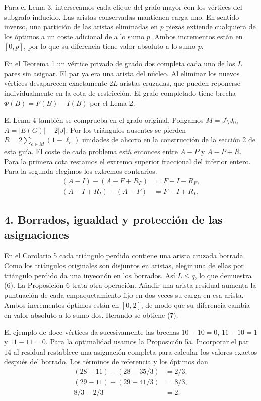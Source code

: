 \documentclass[spanish,11pt,a4paper]{article}
\begin{document}
Para el Lema 3, intersecamos cada clique del grafo mayor con los vértices del subgrafo inducido. Las aristas conservadas mantienen carga uno. En sentido inverso, una partición de las aristas eliminadas en \(p\) piezas extiende cualquiera de los óptimos a un coste adicional de a lo sumo \(p\). Ambos incrementos están en \([0,p]\), por lo que su diferencia tiene valor absoluto a lo sumo \(p\).

En el Teorema 1 un vértice privado de grado dos completa cada uno de los \(L\) pares sin asignar. El par ya era una arista del núcleo. Al eliminar los nuevos vértices desaparecen exactamente \(2L\) aristas cruzadas, que pueden reponerse individualmente en la cota de restricción. El grafo completado tiene brecha \(\Phi(B)=F(B)-I(B)\) por el Lema 2.

El Lema 4 también se comprueba en el grafo original. Pongamos \(M=J\setminus J_0\), \(A=|E(G)|-2|J|\). Por los triángulos ausentes se pierden \(R=2\sum_{e\in M}(1-\ell_e)\) unidades de ahorro en la construcción de la sección 2 de esta guía. El coste de cada problema está entonces entre \(A-P\) y \(A-P+R\). Para la primera cota restamos el extremo superior fraccional del inferior entero. Para la segunda elegimos los extremos contrarios.
\[
\begin{aligned}
(A-I)-(A-F+R_F)&=F-I-R_F,\\
(A-I+R_I)-(A-F)&=F-I+R_I.
\end{aligned}
\]

\subsection{4. Borrados, igualdad y protección de las asignaciones}\label{borrados-igualdad-y-protecciuxf3n-de-las-asignaciones}

En el Corolario 5 cada triángulo perdido contiene una arista cruzada borrada. Como los triángulos originales son disjuntos en aristas, elegir una de ellas por triángulo perdido da una inyección en los borrados. Así \(L\le q\), lo que demuestra (6). La Proposición 6 trata otra operación. Añadir una arista residual aumenta la puntuación de cada empaquetamiento fijo en dos veces su carga en esa arista. Ambos incrementos óptimos están en \([0,2]\), de modo que su diferencia cambia en valor absoluto a lo sumo dos. Iterando se obtiene (7).

El ejemplo de doce vértices da sucesivamente las brechas \(10-10=0\), \(11-10=1\) y \(11-11=0\). Para la optimalidad usamos la Proposición 5a. Incorporar el par \(14\) al residual restablece una asignación completa para calcular los valores exactos después del borrado. Los términos de referencia y los óptimos dan
\[
\begin{aligned}
(28-11)-(28-35/3)&=2/3,\\
(29-11)-(29-41/3)&=8/3,\\
8/3-2/3&=2.
\end{aligned}
\]
\end{document}
